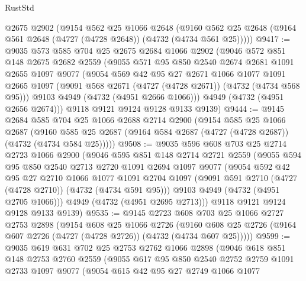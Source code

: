 \begin{lexlean}{RustStd}
\begin{coremodule}
    @2675
    @2902
    (@9154
      @562
      @25
      @1066
      @2648
      (@9160 @562 @25 @2648 (@9164 @561 @2648 (@4727 (@4728 @2648)) (@4732 (@4734 @561 @25)))))
@9417 := @9035
    @573
    @585
    @704
    @25
    @2675
    @2684
    @1066
    @2902
    (@9046
      @572
      @851
      @148
      @2675
      @2682
      @2559
      (@9055
        @571
        @95
        @850
        @2540
        @2674
        @2681
        @1091
        @2655
        @1097
        @9077
        (@9054
          @569
          @42
          @95
          @27
          @2671
          @1066
          @1077
          @1091
          @2665
          @1097
          (@9091 @568 @2671 (@4727 (@4728 @2671)) (@4732 (@4734 @568 @95)))
          @9103
          @4949
          (@4732 (@4951 @2666 @1066)))
        @4949
        (@4732 (@4951 @2656 @2674)))
      @9118
      @9121
      @9124
      @9128
      @9133
      @9139)
@9444 := @9145
    @2684
    @585
    @704
    @25
    @1066
    @2688
    @2714
    @2900
    (@9154
      @585
      @25
      @1066
      @2687
      (@9160 @585 @25 @2687 (@9164 @584 @2687 (@4727 (@4728 @2687)) (@4732 (@4734 @584 @25)))))
@9508 := @9035
    @596
    @608
    @703
    @25
    @2714
    @2723
    @1066
    @2900
    (@9046
      @595
      @851
      @148
      @2714
      @2721
      @2559
      (@9055
        @594
        @95
        @850
        @2540
        @2713
        @2720
        @1091
        @2694
        @1097
        @9077
        (@9054
          @592
          @42
          @95
          @27
          @2710
          @1066
          @1077
          @1091
          @2704
          @1097
          (@9091 @591 @2710 (@4727 (@4728 @2710)) (@4732 (@4734 @591 @95)))
          @9103
          @4949
          (@4732 (@4951 @2705 @1066)))
        @4949
        (@4732 (@4951 @2695 @2713)))
      @9118
      @9121
      @9124
      @9128
      @9133
      @9139)
@9535 := @9145
    @2723
    @608
    @703
    @25
    @1066
    @2727
    @2753
    @2898
    (@9154
      @608
      @25
      @1066
      @2726
      (@9160 @608 @25 @2726 (@9164 @607 @2726 (@4727 (@4728 @2726)) (@4732 (@4734 @607 @25)))))
@9599 := @9035
    @619
    @631
    @702
    @25
    @2753
    @2762
    @1066
    @2898
    (@9046
      @618
      @851
      @148
      @2753
      @2760
      @2559
      (@9055
        @617
        @95
        @850
        @2540
        @2752
        @2759
        @1091
        @2733
        @1097
        @9077
        (@9054
          @615
          @42
          @95
          @27
          @2749
          @1066
          @1077

\end{coremodule}
\end{lexlean}
